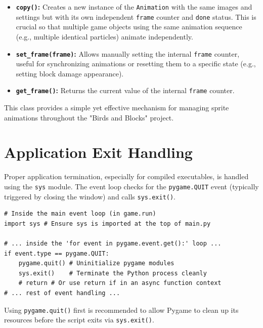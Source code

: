 \documentclass[11pt, a4paper]{article}
\begin{document}
\begin{itemize}

    \item \textbf{\texttt{copy()}:} Creates a new instance of the \texttt{Animation} with the same images and settings but with its own independent \texttt{frame} counter and \texttt{done} status. This is crucial so that multiple game objects using the same animation sequence (e.g., multiple identical particles) animate independently.
    
    \item \textbf{\texttt{set\_frame(frame)}:} Allows manually setting the internal \texttt{frame} counter, useful for synchronizing animations or resetting them to a specific state (e.g., setting block damage appearance).
    
    \item \textbf{\texttt{get\_frame()}:} Returns the current value of the internal \texttt{frame} counter.

\end{itemize}

This class provides a simple yet effective mechanism for managing sprite animations throughout the "Birds and Blocks" project.


\section{Application Exit Handling}
\label{app:exit_handle}

Proper application termination, especially for compiled executables, is handled using the \texttt{sys} module. The event loop checks for the \texttt{pygame.QUIT} event (typically triggered by closing the window) and calls \texttt{sys.exit()}.

\begin{lstlisting}[caption={Handling Quit Event in main.py}, label={lst:exit_logic}]
# Inside the main event loop (in game.run)
import sys # Ensure sys is imported at the top of main.py

# ... inside the 'for event in pygame.event.get():' loop ...
if event.type == pygame.QUIT:
    pygame.quit() # Uninitialize pygame modules
    sys.exit()    # Terminate the Python process cleanly
    # return # Or use return if in an async function context
# ... rest of event handling ...
\end{lstlisting}

Using \texttt{pygame.quit()} first is recommended to allow Pygame to clean up its resources before the script exits via \texttt{sys.exit()}.
\end{document}
